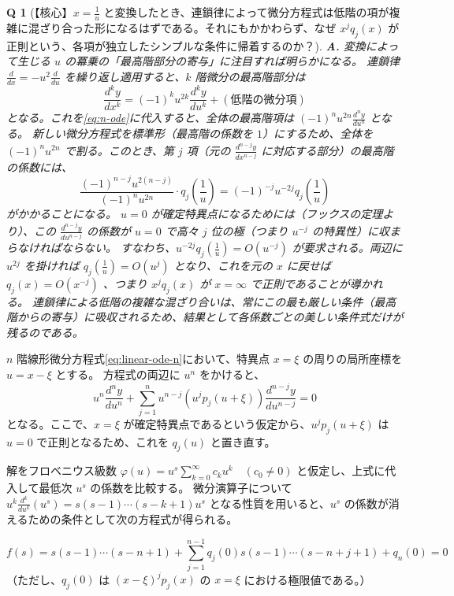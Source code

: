 \documentclass[paper=a4, fontsize=11pt]{jlreq} %
\theoremstyle{break}
\theoremstyle{qa}
\newtheorem*{Q}{Q}
\theoremstyle{remark} %
\begin{document}
\begin{Q}[【核心】$x=\frac{1}{u}$ と変換したとき、連鎖律によって微分方程式は低階の項が複雑に混ざり合った形になるはずである。それにもかかわらず、なぜ $x^{j}q_{j}(x)$ が正則という、各項が独立したシンプルな条件に帰着するのか？]
\textbf{A.} 変換によって生じる $u$ の冪乗の「最高階部分の寄与」に注目すれば明らかになる。
連鎖律 $\frac{d}{dx} = -u^{2}\frac{d}{du}$ を繰り返し適用すると、$k$ 階微分の最高階部分は
\[
\frac{d^{k}y}{dx^{k}} = (-1)^{k} u^{2k} \frac{d^{k}y}{du^{k}} + (\text{低階の微分項})
\]
となる。これを\eqref{eq:n-ode}に代入すると、全体の最高階項は $(-1)^{n} u^{2n} \frac{d^{n}y}{du^{n}}$ となる。
新しい微分方程式を標準形（最高階の係数を $1$）にするため、全体を $(-1)^{n} u^{2n}$ で割る。このとき、第 $j$ 項（元の $\frac{d^{n-j}y}{dx^{n-j}}$ に対応する部分）の最高階の係数には、
\[
\frac{(-1)^{n-j} u^{2(n-j)}}{(-1)^{n} u^{2n}} \cdot q_{j}\left(\frac{1}{u}\right) = (-1)^{-j} u^{-2j} q_{j}\left(\frac{1}{u}\right)
\]
がかかることになる。
$u=0$ が確定特異点になるためには（フックスの定理より）、この $\frac{d^{n-j}y}{du^{n-j}}$ の係数が $u=0$ で高々 $j$ 位の極（つまり $u^{-j}$ の特異性）に収まらなければならない。
すなわち、$u^{-2j} q_{j}(\frac{1}{u}) = O(u^{-j})$ が要求される。両辺に $u^{2j}$ を掛ければ $q_{j}(\frac{1}{u}) = O(u^{j})$ となり、これを元の $x$ に戻せば $q_{j}(x) = O(x^{-j})$ 、つまり $x^{j}q_{j}(x)$ が $x=\infty$ で正則であることが導かれる。
連鎖律による低階の複雑な混ざり合いは、常にこの最も厳しい条件（最高階からの寄与）に吸収されるため、結果として各係数ごとの美しい条件式だけが残るのである。
\end{Q}
$n$ 階線形微分方程式\eqref{eq:linear-ode-n}において、特異点 $x=\xi$ の周りの局所座標を $u = x-\xi$ とする。
方程式の両辺に $u^{n}$ をかけると、
\[
u^{n}\frac{d^{n}y}{du^{n}} + \sum_{j=1}^{n} u^{n-j} \left( u^{j}p_{j}(u+\xi) \right) \frac{d^{n-j}y}{du^{n-j}} = 0
\]
となる。ここで、$x=\xi$ が確定特異点であるという仮定から、$u^{j}p_{j}(u+\xi)$ は $u=0$ で正則となるため、これを $q_{j}(u)$ と置き直す。

解をフロベニウス級数 $\varphi(u) = u^{s} \sum_{k=0}^{\infty} c_{k} u^{k} \quad (c_{0} \neq 0)$ と仮定し、上式に代入して最低次 $u^{s}$ の係数を比較する。
微分演算子について $u^{k} \frac{d^{k}}{du^{k}} (u^{s}) = s(s-1)\cdots(s-k+1)u^{s}$ となる性質を用いると、$u^{s}$ の係数が消えるための条件として次の方程式が得られる。

\begin{equation}\label{eq:indicial-n}
f(s) = s(s-1)\cdots(s-n+1) + \sum_{j=1}^{n-1} q_{j}(0) s(s-1)\cdots(s-n+j+1) + q_{n}(0) = 0
\end{equation}
（ただし、$q_{j}(0)$ は $(x-\xi)^{j}p_{j}(x)$ の $x=\xi$ における極限値である。）
\end{document}
